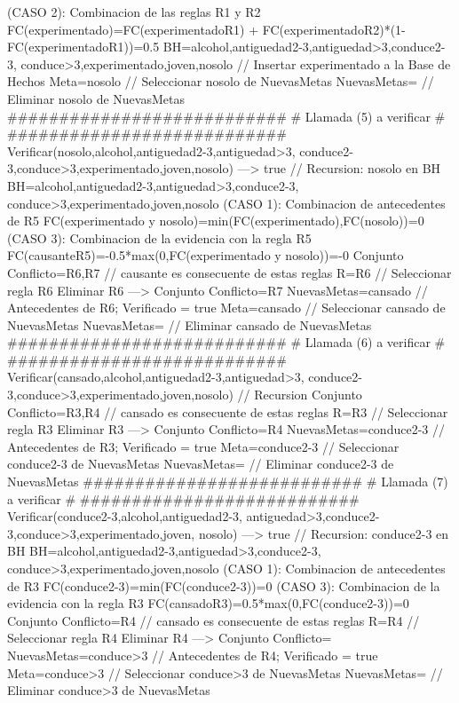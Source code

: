 \begin{listing}[language=Pascal]
	(CASO 2): Combinacion de las reglas R1 y R2
	 FC(experimentado)=FC(experimentado{R1}) + FC(experimentado{R2})*(1-FC(experimentado{R1}))=0.5
	BH={alcohol,antiguedad2-3,antiguedad>3,conduce2-3,
	conduce>3,experimentado,joven,nosolo} // Insertar experimentado a la Base de Hechos
	Meta=nosolo // Seleccionar nosolo de NuevasMetas
	NuevasMetas={} // Eliminar nosolo de NuevasMetas
  ###########################
  # Llamada (5) a verificar #
  ###########################
	Verificar(nosolo,{alcohol,antiguedad2-3,antiguedad>3,
	conduce2-3,conduce>3,experimentado,joven,nosolo}) ---> true // Recursion: nosolo en BH
	BH={alcohol,antiguedad2-3,antiguedad>3,conduce2-3,
	conduce>3,experimentado,joven,nosolo}
	(CASO 1): Combinacion de antecedentes de R5
	 FC(experimentado y nosolo)=min(FC(experimentado),FC(nosolo))=0
	(CASO 3): Combinacion de la evidencia con la regla R5
	 FC(causante{R5})=-0.5*max(0,FC(experimentado y nosolo))=-0
	Conjunto Conflicto={R6,R7} // causante es consecuente de estas reglas
	R={R6} // Seleccionar regla R6
	Eliminar R6 ---> Conjunto Conflicto={R7}
	NuevasMetas={cansado} // Antecedentes de R6; Verificado = true
	Meta=cansado // Seleccionar cansado de NuevasMetas
	NuevasMetas={} // Eliminar cansado de NuevasMetas
  ###########################
  # Llamada (6) a verificar #
  ###########################
	Verificar(cansado,{alcohol,antiguedad2-3,antiguedad>3,
	conduce2-3,conduce>3,experimentado,joven,nosolo})   // Recursion 
	Conjunto Conflicto={R3,R4} // cansado es consecuente de estas reglas
	R={R3} // Seleccionar regla R3
	Eliminar R3 ---> Conjunto Conflicto={R4}
	NuevasMetas={conduce2-3} // Antecedentes de R3; Verificado = true
	Meta=conduce2-3 // Seleccionar conduce2-3 de NuevasMetas
	NuevasMetas={} // Eliminar conduce2-3 de NuevasMetas
  ###########################
  # Llamada (7) a verificar #
  ###########################
	Verificar(conduce2-3,{alcohol,antiguedad2-3,
	antiguedad>3,conduce2-3,conduce>3,experimentado,joven,
	nosolo}) ---> true // Recursion: conduce2-3 en BH
	BH={alcohol,antiguedad2-3,antiguedad>3,conduce2-3,
	conduce>3,experimentado,joven,nosolo}
	(CASO 1): Combinacion de antecedentes de R3
	 FC(conduce2-3)=min(FC(conduce2-3))=0
	(CASO 3): Combinacion de la evidencia con la regla R3
	 FC(cansado{R3})=0.5*max(0,FC(conduce2-3))=0
	Conjunto Conflicto={R4} // cansado es consecuente de estas reglas
	R={R4} // Seleccionar regla R4
	Eliminar R4 ---> Conjunto Conflicto={}
	NuevasMetas={conduce>3} // Antecedentes de R4; Verificado = true
	Meta=conduce>3 // Seleccionar conduce>3 de NuevasMetas
	NuevasMetas={} // Eliminar conduce>3 de NuevasMetas

\end{listing}
